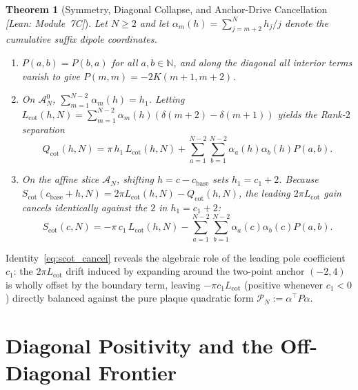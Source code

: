 \documentclass[10pt,a4paper]{article}
\newtheorem{theorem}{Theorem}[section]
\theoremstyle{definition}
\begin{document}
\begin{theorem}[Symmetry, Diagonal Collapse, and Anchor-Drive Cancellation \emph{[Lean: Module~7C]}]\label{thm:plaque_cancel}
Let $N \ge 2$ and let $\alpha_m(h) = \sum_{j=m+2}^N h_j / j$ denote the cumulative suffix dipole coordinates.
\begin{enumerate}[leftmargin=1.8em,itemsep=2pt]
\item $P(a,b) = P(b,a)$ for all $a,b \in \mathbb{N}$, and along the diagonal all interior terms vanish to give $P(m,m) = -2 K(m+1,m+2)$.
\item On $\mathcal{A}_N^0$, $\sum_{m=1}^{N-2} \alpha_m(h) = h_1$. Letting $L_{\mathrm{cot}}(h,N) = \sum_{m=1}^{N-2}\alpha_m(h)(\delta(m+2)-\delta(m+1))$ yields the Rank-$2$ separation
\begin{equation}\label{eq:qcot_plaque}
Q_{\mathrm{cot}}(h, N) = \pi \, h_1 \, L_{\mathrm{cot}}(h, N) + \sum_{a=1}^{N-2}\sum_{b=1}^{N-2} \alpha_a(h)\alpha_b(h) P(a,b).
\end{equation}
\item On the affine slice $\mathcal{A}_N$, shifting $h = c - c_{\mathrm{base}}$ sets $h_1 = c_1 + 2$. Because $S_{\mathrm{cot}}(c_{\mathrm{base}} + h, N) = 2\pi L_{\mathrm{cot}}(h, N) - Q_{\mathrm{cot}}(h, N)$, the leading $2\pi L_{\mathrm{cot}}$ gain cancels identically against the $2$ in $h_1 = c_1 + 2$:
\begin{equation}\label{eq:scot_cancel}
S_{\mathrm{cot}}(c, N) = -\pi \, c_1 \, L_{\mathrm{cot}}(h, N) - \sum_{a=1}^{N-2}\sum_{b=1}^{N-2} \alpha_a(c)\alpha_b(c) P(a,b).
\end{equation}
\end{enumerate}
\end{theorem}

Identity~\eqref{eq:scot_cancel} reveals the algebraic role of the leading pole coefficient $c_1$: the $2\pi L_{\mathrm{cot}}$ drift induced by expanding around the two-point anchor $(-2, 4)$ is wholly offset by the boundary term, leaving $-\pi c_1 L_{\mathrm{cot}}$ (positive whenever $c_1 < 0$) directly balanced against the pure plaque quadratic form $\mathcal{P}_N := \alpha^\top P \alpha$.

\section{Diagonal Positivity and the Off-Diagonal Frontier}\label{sec:diag_offdiag}
\end{document}
